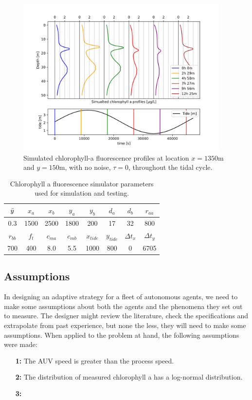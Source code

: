 \begin{figure}
    \centering
    \includegraphics[width=0.95\textwidth]{figures/profilesx1350y150.png}
    \caption{Simulated chlorophyll-a fluorescence profiles at location $x=1350$m and $y=150$m, with no noise, $\tau = 0$, throughout the tidal cycle. }
    \label{fig:tidalsim}
\end{figure}


\begin{table}[]
    \centering
    \begin{tabular}{|c|c|c|c|c|c|c|c|}
    \hline
        $\Bar{y}$ & $x_a$ & $x_b$& $y_a$& $y_b$& $d_a$& $d_b$& $r_{aa}$  \\
        \hline
        0.3 & 1500 & 2500 & 1800 & 200 & 17 & 32 & 800 \\
        \hline 
        $r_{bb}$ & $f_t$& $c_{ma}$& $c_{mb}$ & $x_{tide}$ & $y_{tide}$ & $\Delta t_{x}$ &  $\Delta t_{y}$  \\
        \hline 
        700 & 400 & 8.0 & 5.5 & 1000 & 800 & 0 & 6705 \\
        \hline 
    \end{tabular}
    \caption{Chlorophyll a fluorescence simulator parameters used for simulation and testing. }
    \label{tab:const_app}
\end{table}


\subsection{Assumptions}
In designing an adaptive strategy for a fleet of autonomous agents, we need to make some assumptions about both the agents and the phenomena they set out to measure. The designer might review the literature, check the specifications and extrapolate from past experience, but none the less, they will need to make some assumptions. When applied to the problem at hand, the following assumptions were made: 
\begin{itemize}
    \item[\textbf{1:}] The AUV speed is greater than the process speed. 
    \item[\textbf{2:}] The distribution of measured chlorophyll a has a log-normal distribution. 
    \item[\textbf{3:}] 
\end{itemize}

